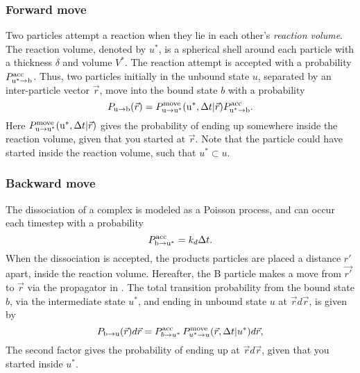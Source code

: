 \subsubsection{Forward move}
Two particles attempt a reaction when they lie in each other's {\it reaction volume}. The reaction volume, denoted by $u^*$, is a spherical shell around each particle with a thickness $\delta$ and volume $V^*$. The reaction attempt is accepted with a probability $P^{\rm acc}_{{\rm u}^* \to {\rm b}}$. Thus, two particles initially in the unbound state $u$, separated by an inter-particle vector $\vec{r}$, move into the bound state $b$ with a probability
\begin{equation}
 \elabel{BD_Fwdmove}
P_{ \rm{u} \to \rm{b} }(\vec{r}) = P^{\rm move}_{{\rm u} \to {\rm u}^*}({\rm u}^*,\Delta t|\vec{r}) P^{\rm acc}_{{\rm u}^* \to {\rm b}}.
\end{equation}
Here $P^{\rm move}_{{\rm u} \to {\rm u}^*}({\rm u}^*,\Delta t|\vec{r})$ gives the probability of ending up somewhere inside the reaction volume, given that you started at $\vec{r}$. Note that the particle could have started inside the reaction volume, such that $u^* \subset u$.

\subsubsection{Backward move}
The dissociation of a complex is modeled as a Poisson process, and can occur each timestep with a probability
\begin{equation}
 P^{\rm acc}_{\rm b \to u^*} = k_d \Delta t.
\end{equation}
When the dissociation is accepted, the products particles are placed a distance $r'$ apart, inside the reaction volume. Hereafter, the B particle makes a move from $\vec{r'}$ to $\vec{r}$ via the propagator in . The total transition probability from the bound state $b$, via the intermediate state $u^*$, and ending in unbound state $u$ at $\vec{r}d\vec{r}$, is given by
\begin{equation}
 \elabel{BD_Bwdmove}
P_{ \rm{b} \to \rm{u}}(\vec{r})d\vec{r} =  P^{\rm acc}_{b \to u^*}\,P^{\rm move}_{u^* \to u}(\vec{r},\Delta t|u^*)d\vec{r},
\end{equation}
The second factor gives the probability of ending up at $\vec{r}d\vec{r}$, given that you started inside $u^*$.

